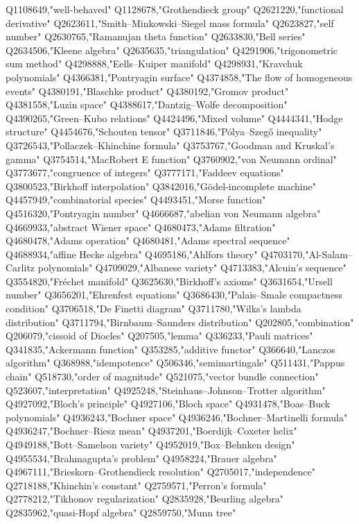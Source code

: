 Q1108649,"well-behaved"
Q1128678,"Grothendieck group"
Q2621220,"functional derivative"
Q2623611,"Smith–Minkowski–Siegel mass formula"
Q2623827,"self number"
Q2630765,"Ramanujan theta function"
Q2633830,"Bell series"
Q2634506,"Kleene algebra"
Q2635635,"triangulation"
Q4291906,"trigonometric sum method"
Q4298888,"Eells–Kuiper manifold"
Q4298931,"Kravchuk polynomials"
Q4366381,"Pontryagin surface"
Q4374858,"The flow of homogeneous events"
Q4380191,"Blaschke product"
Q4380192,"Gromov product"
Q4381558,"Luzin space"
Q4388617,"Dantzig–Wolfe decomposition"
Q4390265,"Green–Kubo relations"
Q4424496,"Mixed volume"
Q4444341,"Hodge structure"
Q4454676,"Schouten tensor"
Q3711846,"Pólya–Szegő inequality"
Q3726543,"Pollaczek–Khinchine formula"
Q3753767,"Goodman and Kruskal's gamma"
Q3754514,"MacRobert E function"
Q3760902,"von Neumann ordinal"
Q3773677,"congruence of integers"
Q3777171,"Faddeev equations"
Q3800523,"Birkhoff interpolation"
Q3842016,"Gödel-incomplete machine"
Q4457949,"combinatorial species"
Q4493451,"Morse function"
Q4516320,"Pontryagin number"
Q4666687,"abelian von Neumann algebra"
Q4669933,"abstract Wiener space"
Q4680473,"Adams filtration"
Q4680478,"Adams operation"
Q4680481,"Adams spectral sequence"
Q4688934,"affine Hecke algebra"
Q4695186,"Ahlfors theory"
Q4703170,"Al-Salam–Carlitz polynomials"
Q4709029,"Albanese variety"
Q4713383,"Alcuin's sequence"
Q3554820,"Fréchet manifold"
Q3625630,"Birkhoff's axioms"
Q3631654,"Ursell number"
Q3656201,"Ehrenfest equations"
Q3686430,"Palais–Smale compactness condition"
Q3706518,"De Finetti diagram"
Q3711780,"Wilks's lambda distribution"
Q3711794,"Birnbaum–Saunders distribution"
Q202805,"combination"
Q206079,"cissoid of Diocles"
Q207505,"lemma"
Q336233,"Pauli matrices"
Q341835,"Ackermann function"
Q353285,"additive functor"
Q366640,"Lanczos algorithm"
Q368988,"idempotence"
Q506346,"semimartingale"
Q511431,"Pappus chain"
Q518730,"order of magnitude"
Q521075,"vector bundle connection"
Q523607,"interpretation"
Q4925248,"Steinhaus–Johnson–Trotter algorithm"
Q4927092,"Bloch's principle"
Q4927106,"Bloch space"
Q4931478,"Boas–Buck polynomials"
Q4936243,"Bochner space"
Q4936246,"Bochner–Martinelli formula"
Q4936247,"Bochner–Riesz mean"
Q4937201,"Boerdijk–Coxeter helix"
Q4949188,"Bott–Samelson variety"
Q4952019,"Box–Behnken design"
Q4955534,"Brahmagupta's problem"
Q4958224,"Brauer algebra"
Q4967111,"Brieskorn–Grothendieck resolution"
Q2705017,"independence"
Q2718188,"Khinchin's constant"
Q2759571,"Perron's formula"
Q2778212,"Tikhonov regularization"
Q2835928,"Beurling algebra"
Q2835962,"quasi-Hopf algebra"
Q2859750,"Munn tree"
